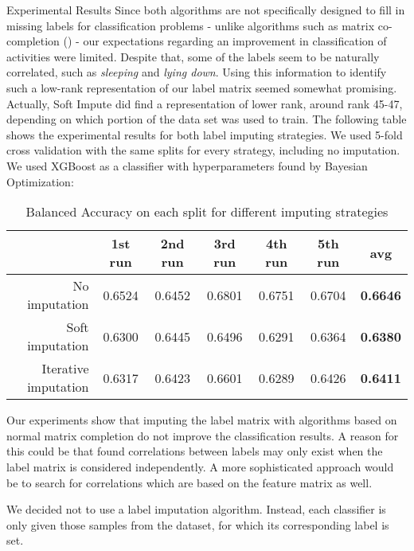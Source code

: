 \begin{subsection}{Experimental Results}
	Since both algorithms are not specifically designed to fill in missing labels for classification problems - unlike algorithms such as matrix co-completion (\cite{Xu18}) - our expectations regarding an improvement in classification of activities were limited. Despite that, some of the labels seem to be naturally correlated, such as \emph{sleeping} and \emph{lying down}. Using this information to identify such a low-rank representation of our label matrix seemed somewhat promising. Actually, Soft Impute did find a representation of lower rank, around rank 45-47, depending on which portion of the data set was used to train. The following table shows the experimental results for both label imputing strategies. We used 5-fold cross validation with the same splits for every strategy, including no imputation. We used XGBoost as a classifier with hyperparameters found by Bayesian Optimization:
	\begin{table}[H]
		\begin{center}
		\caption{Balanced Accuracy on each split for different imputing strategies}
		\begin{tabular}{r||c|c|c|c|c|c}
			\toprule
			& 1st run &2nd run &3rd run& 4th run & 5th run & avg\\
			\midrule
			No imputation&0.6524&0.6452&0.6801&0.6751&0.6704&\textbf{0.6646}\\
			
			Soft imputation&0.6300&0.6445&0.6496&0.6291&0.6364&\textbf{0.6380}\\
			Iterative imputation&0.6317&0.6423&0.6601&0.6289&0.6426&\textbf{0.6411}\\
			\bottomrule
		\end{tabular}		
		\end{center}	
	\end{table}

	Our experiments show that imputing the label matrix with algorithms based on normal matrix completion do not improve the classification results. A reason for this could be that found correlations between labels may only exist when the label matrix is considered independently. A more sophisticated approach would be to search for correlations which are based on the feature matrix as well. \par
	We decided not to use a label imputation algorithm. Instead, each classifier is only given those samples from the dataset, for which its corresponding label is set.
\end{subsection}